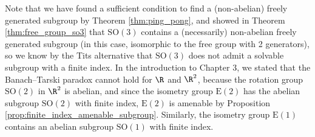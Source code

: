 Note that we have found a sufficient condition to find a (non-abelian) freely generated subgroup by Theorem \ref{thm:ping_pong}, and showed in Theorem \ref{thm:free_group_so3} that $\text{SO}(3)$ contains a (necessarily) non-abelian freely generated subgroup (in this case, isomorphic to the free group with 2 generators), so we know by the Tits alternative that $\text{SO}(3)$ does not admit a solvable subgroup with a finite index. In the introduction to Chapter 3, we stated that the Banach--Tarski paradox cannot hold for $\R$ and $\R^2$, because the rotation group $\text{SO}\left(2\right)$ in $\R^2$ is abelian, and since the isometry group $\text{E}\left(2\right)$ has the abelian subgroup $\text{SO}\left(2\right)$ with finite index, $\text{E}\left(2\right)$ is amenable by Proposition \ref{prop:finite_index_amenable_subgroup}. Similarly, the isometry group $\text{E}(1)$ contains an abelian subgroup $\text{SO}(1)$ with finite index.

